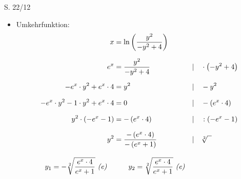 \begin{Exercise}{S. 22/12}{}
\begin{enumerate}
\begin{itemize}[leftmargin=*]
\begin{align*}
                    0 &= 4 + t &&| \quad -4\\[1.5ex]
                    t &= -4 &&
                \end{align*}\\[-2.0ex]
                $\Rightarrow f^{-1}_{T}(x) = 2\sqrt{2}x - 4$\\[-2.0ex]
                \begin{align*}
                   f_{T}(x): \quad x &= 2\sqrt{2}y - 4 &&| \quad +4\\[1.5ex]
                   x + 4 &= 2\sqrt{2}y &&| \quad :2\sqrt{2}\\[1.5ex]
                   y &= \dfrac{x - 4}{2\sqrt{2}} &&\\[1.5ex]
                   y &= \dfrac{1}{2\sqrt{2}} \cdot x - \dfrac{4}{2\sqrt{2}} &&\\[1.5ex]
                   y &= \dfrac{\sqrt{2}}{4} \cdot x + \sqrt{2}&&
                \end{align*}\\[-2.0ex]
                $\Rightarrow \quad \uuline{f_{T}(x) = \dfrac{\sqrt{2}}{4} \cdot x + \sqrt{2}}$\\[1.0ex]
                Begründung: Symmetrie zur Winkelhalbierenden $y=x$\\
            \item Umkehrfunktion: \\{
                \vspace{-3.0ex}
                \begin{align*}
                    x &= \ln\left(\dfrac{y^{2}}{-y^{2} + 4}\right) &&\\[1.5ex]
                    e^{x} &= \dfrac{y^{2}}{-y^{2} + 4} &&| \quad \cdot \left(-y^{2} + 4\right)\\[1.5ex]
                    - e^{x} \cdot y^{2} + e^{x} \cdot 4 &= y^{2} &&| \quad -y^{2}\\[1.5ex]
                    - e^{x} \cdot y^{2} - 1 \cdot y^{2} + e^{x} \cdot 4 &= 0 && | \quad - \left(e^{x} \cdot 4\right)\\[1.5ex]
                    y^{2} \cdot \left(- e^{x} - 1\right) &= - \left(e^{x} \cdot 4\right) &&| \quad :\left(- e^{x} - 1\right)\\[1.5ex]
                    y^{2} &= \dfrac{- \left(e^{x} \cdot 4\right)}{-\left(e^{x} + 1\right)} &&| \quad \sqrt[2]{\phantom{x}}\\[2.0ex]
                    y_{1} = - \sqrt[2]{\dfrac{e^{x} \cdot 4}{e^{x} + 1}} \ \text{\textit{(e)}} \quad & \qquad y_{2} = \sqrt[2]{\dfrac{e^{x} \cdot 4}{e^{x} + 1}} \ \text{\textit{(e)}} &&

\end{align*}}
\end{itemize}
\end{enumerate}
\end{Exercise}
